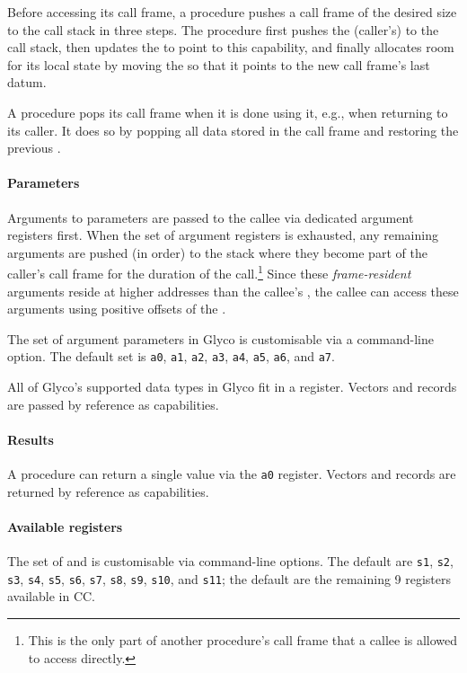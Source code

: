 \documentclass[main.tex]{subfiles}
\begin{document}
Before accessing its call frame, a procedure pushes a call frame of the desired size to the call stack in three steps. The procedure first pushes the (caller's)  to the call stack, then updates the  to point to this capability, and finally allocates room for its local state by moving the  so that it points to the new call frame's last datum.

A procedure pops its call frame when it is done using it, e.g., when returning to its caller. It does so by popping all data stored in the call frame and restoring the previous .

\paragraph{Parameters} Arguments to parameters are passed to the callee via dedicated argument registers first. When the set of argument registers is exhausted, any remaining arguments are pushed (in order) to the stack where they become part of the caller's call frame for the duration of the call.\footnote{This is the only part of another procedure's call frame that a callee is allowed to access directly.} Since these \emph{frame-resident} arguments reside at higher addresses than the callee's , the callee can access these arguments using positive offsets of the .

The set of argument parameters in Glyco is customisable via a command-line option. The default set is \texttt{a0}, \texttt{a1}, \texttt{a2}, \texttt{a3}, \texttt{a4}, \texttt{a5}, \texttt{a6}, and \texttt{a7}.

All of Glyco's supported data types in Glyco fit in a register. Vectors and records are passed by reference as capabilities.

\paragraph{Results} A procedure can return a single value via the \texttt{a0} register. Vectors and records are returned by reference as capabilities.

\paragraph{Available registers} The set of  and  is customisable via command-line options. The default  are \texttt{s1}, \texttt{s2}, \texttt{s3}, \texttt{s4}, \texttt{s5}, \texttt{s6}, \texttt{s7}, \texttt{s8}, \texttt{s9}, \texttt{s10}, and \texttt{s11}; the default  are the remaining 9 registers available in CC.
\end{document}
